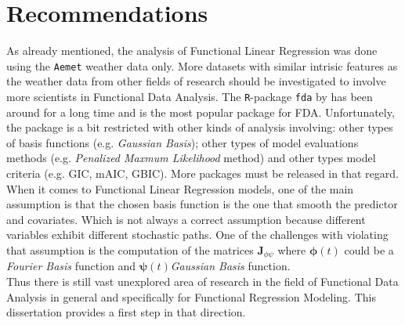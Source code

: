 \section{Recommendations}
As already mentioned, the analysis of Functional Linear Regression was done using the \texttt{Aemet} weather data only. More datasets with similar intrisic features as the weather data from other fields of research should be investigated to involve more scientists in Functional Data Analysis. The \texttt{R}-package \texttt{fda} by \cite{Ramsay2009FDA} has been around for a long time and is the most popular package for FDA. Unfortunately, the package is a bit restricted with other kinds of analysis involving: other types of basis functions (e.g. \textit{Gaussian Basis}); other types of model evaluations methods (e.g. \textit{Penalized Maxmum Likelihood} method) and other types model criteria (e.g. GIC, mAIC, GBIC). More packages must be released in that regard.\\
When it comes to Functional Linear Regression models, one of the main assumption is that the chosen basis function is the one that smooth the predictor and covariates. Which is not always a correct assumption because different variables exhibit different stochastic paths. One of the challenges with violating that assumption is the computation of the matrices $\bm{J}_{\phi \psi}$ where $\bm{\phi}(t)$ could be a \textit{Fourier Basis} function and $\bm{\psi}(t)$\textit{Gaussian Basis} function.\\
Thus there is still vast unexplored area of research in the field of Functional Data Analysis in general and specifically for Functional Regression Modeling. This dissertation provides a first step in that direction.